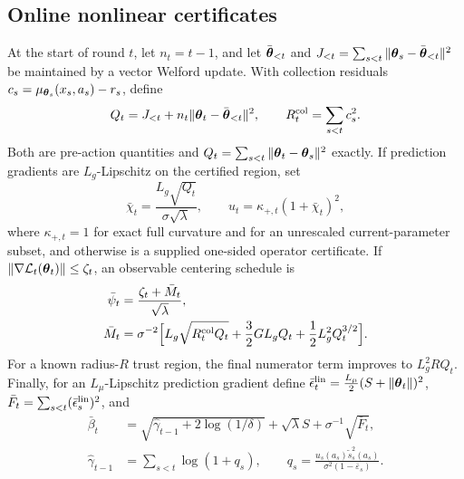 \documentclass[twoside]{article}
\begin{document}
\subsection{Online nonlinear certificates}\label{sec:operational-certificates}
At the start of round $t$, let $n_t=t-1$, and let $\bar{\boldsymbol{\theta}}_{<t}$ and
$J_{<t}=\sum_{s<t}\|\boldsymbol{\theta}_s-\bar{\boldsymbol{\theta}}_{<t}\|^2$ be maintained by a
vector Welford update.  With collection residuals
$c_s=\mu_{\boldsymbol{\theta}_s}(x_s,a_s)-r_s$, define
\begin{equation}\label{eq:path-stats-main}
 Q_t=J_{<t}+n_t\|\boldsymbol{\theta}_t-\bar{\boldsymbol{\theta}}_{<t}\|^2,
 \qquad R_t^{\rm col}=\sum_{s<t}c_s^2.
\end{equation}
Both are pre-action quantities and
$Q_t=\sum_{s<t}\|\boldsymbol{\theta}_t-\boldsymbol{\theta}_s\|^2$ exactly.  If prediction gradients
are $L_g$-Lipschitz on the certified region, set
\begin{equation}\label{eq:operational-transfer-main}
 \bar\chi_t=\frac{L_g\sqrt{Q_t}}{\sigma\sqrt\lambda},\qquad
 u_t=\kappa_{+,t}(1+\bar\chi_t)^2,
\end{equation}
where $\kappa_{+,t}=1$ for exact full curvature and for an unrescaled
current-parameter subset, and otherwise is a supplied one-sided operator
certificate.  If $\|\nabla\mathcal{L}_t(\boldsymbol{\theta}_t)\|\le\zeta_t$, an observable
centering schedule is
\begin{equation}\label{eq:operational-centering-main}
\begin{aligned}
 \bar\psi_t&=\frac{\zeta_t+\bar M_t}{\sqrt\lambda},\\
 \bar M_t&=\sigma^{-2}\Bigl[L_g\sqrt{R_t^{\rm col}Q_t}
 +\frac{3}{2}GL_gQ_t+\frac{1}{2}L_g^2Q_t^{3/2}\Bigr].
\end{aligned}
\end{equation}
For a known radius-$R$ trust region, the final numerator term improves to
$L_g^2RQ_t$.  Finally, for an $L_\mu$-Lipschitz prediction gradient define
$\bar\epsilon_t^{\rm lin}=\frac{L_\mu}{2}(S+\|\boldsymbol{\theta}_t\|)^2$,
$\bar F_t=\sum_{s<t}(\bar\epsilon_s^{\rm lin})^2$, and
\begin{equation}\label{eq:operational-beta-main}
\begin{aligned}
 \bar\beta_t&=\sqrt{\hat\gamma_{t-1}+2\log(1/\delta)}+\sqrt\lambda S
 +\sigma^{-1}\sqrt{\bar F_t},\\
 \hat\gamma_{t-1}&=\sum_{s<t}\log(1+q_s),\qquad
 q_s=\frac{u_s(a_s)\tilde s_s^2(a_s)}{\sigma^2(1-\bar\varepsilon_s)}.
\end{aligned}
\end{equation}
\end{document}
